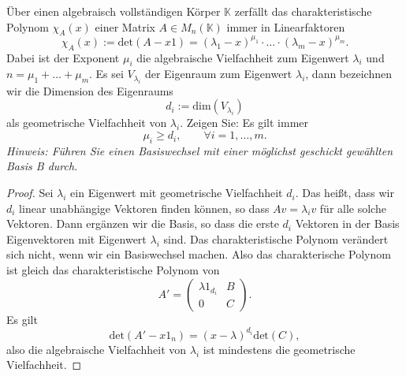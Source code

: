 \begin{Problem}
	Über einen algebraisch vollständigen Körper $\mathbb{K}$ zerfällt das charakteristische Polynom $\chi_A (x)$ einer Matrix $A\in M_n(\mathbb{K})$ immer in Linearfaktoren
	\[
		\chi_A(x):=\text{det}(A-x 1)=(\lambda_1-x)^{\mu_1}\cdot\dots\cdot(\lambda_m-x)^{\mu_m}
	.\] 
	Dabei ist der Exponent $\mu_i$ die algebraische Vielfachheit zum Eigenwert $\lambda_i$ und $n=\mu_1+\dots+\mu_m$. Es sei $V_{\lambda_i}$ der Eigenraum zum Eigenwert $\lambda_i$, dann bezeichnen wir die Dimension des Eigenraums
	\[
		d_i:=\text{dim}(V_{\lambda_i})\] als geometrische Vielfachheit von $\lambda_i$. Zeigen Sie: Es gilt immer
		\[
		\mu_i\ge d_i,\qquad\forall i=1,\dots,m
		.\] 
		{\footnotesize\emph{Hinweis: Führen Sie einen Basiswechsel mit einer möglichst geschickt gewählten Basis B durch.}} 
\end{Problem}
\begin{proof}
	Sei $\lambda_i$ ein Eigenwert mit geometrische Vielfachheit $d_i$. Das heißt, dass wir $d_i$ linear unabhängige Vektoren finden können, so dass $Av=\lambda_i v$ f\"{u}r alle solche Vektoren. Dann ergänzen wir die Basis, so dass die erste $d_i$ Vektoren in der Basis Eigenvektoren mit Eigenwert $\lambda_i$ sind. Das charakteristische Polynom verändert sich nicht, wenn wir ein Basiswechsel machen. Also das charakterische Polynom ist gleich das charakteristische Polynom von
	\[
		A'=\begin{pmatrix} \lambda 1_{d_i} & B \\ 0 & C \end{pmatrix} 
	.\] 
	Es gilt
	\[
		\text{det}(A'-x 1_n)=(x-\lambda)^{d_i}\text{det}(C) 
	,\]
	also die algebraische Vielfachheit von $\lambda_i$ ist mindestens die geometrische Vielfachheit.
\end{proof}
